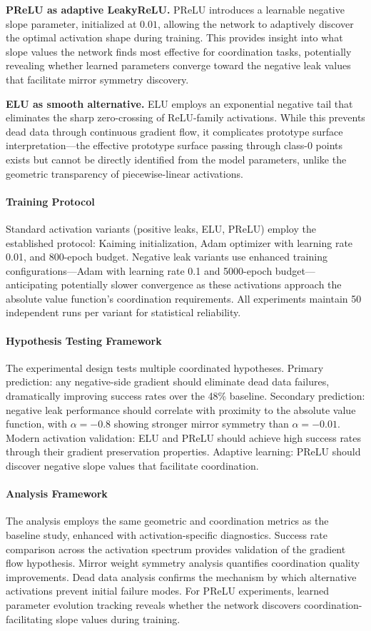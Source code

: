 \textbf{PReLU as adaptive LeakyReLU.} PReLU introduces a learnable negative slope parameter, initialized at $0.01$, allowing the network to adaptively discover the optimal activation shape during training. This provides insight into what slope values the network finds most effective for coordination tasks, potentially revealing whether learned parameters converge toward the negative leak values that facilitate mirror symmetry discovery.

\textbf{ELU as smooth alternative.} ELU employs an exponential negative tail that eliminates the sharp zero-crossing of ReLU-family activations. While this prevents dead data through continuous gradient flow, it complicates prototype surface interpretation—the effective prototype surface passing through class-0 points exists but cannot be directly identified from the model parameters, unlike the geometric transparency of piecewise-linear activations.

\paragraph{Training Protocol}
Standard activation variants (positive leaks, ELU, PReLU) employ the established protocol: Kaiming initialization, Adam optimizer with learning rate 0.01, and 800-epoch budget. Negative leak variants use enhanced training configurations—Adam with learning rate 0.1 and 5000-epoch budget—anticipating potentially slower convergence as these activations approach the absolute value function's coordination requirements. All experiments maintain 50 independent runs per variant for statistical reliability.

\paragraph{Hypothesis Testing Framework}
The experimental design tests multiple coordinated hypotheses. Primary prediction: any negative-side gradient should eliminate dead data failures, dramatically improving success rates over the 48\% baseline. Secondary prediction: negative leak performance should correlate with proximity to the absolute value function, with $\alpha = -0.8$ showing stronger mirror symmetry than $\alpha = -0.01$. Modern activation validation: ELU and PReLU should achieve high success rates through their gradient preservation properties. Adaptive learning: PReLU should discover negative slope values that facilitate coordination.

\paragraph{Analysis Framework}
The analysis employs the same geometric and coordination metrics as the baseline study, enhanced with activation-specific diagnostics. Success rate comparison across the activation spectrum provides validation of the gradient flow hypothesis. Mirror weight symmetry analysis quantifies coordination quality improvements. Dead data analysis confirms the mechanism by which alternative activations prevent initial failure modes. For PReLU experiments, learned parameter evolution tracking reveals whether the network discovers coordination-facilitating slope values during training.

